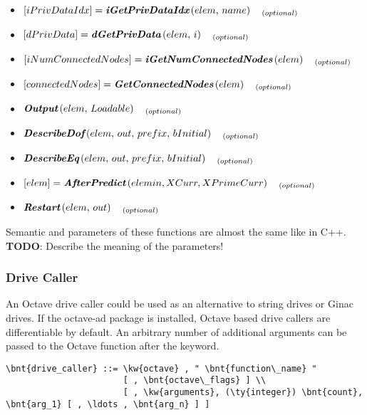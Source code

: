 \begin{itemize}
\item $\left[iPrivDataIdx\right] = \textit{\textbf{iGetPrivDataIdx}}\left(elem,\,name\right)\quad_{(optional)}$
\item $\left[dPrivData\right] = \textit{\textbf{dGetPrivData}}\left(elem,\,i\right)\quad_{(optional)}$
\item $\left[iNumConnectedNodes\right] = \textit{\textbf{iGetNumConnectedNodes}}\left(elem\right)\quad_{(optional)}$
\item $\left[connectedNodes\right] = \textit{\textbf{GetConnectedNodes}}\left(elem\right)\quad_{(optional)}$
\item $\textit{\textbf{Output}}\left(elem,\,Loadable\right)\quad_{(optional)}$
\item $\textit{\textbf{DescribeDof}}\left(elem,\,out,\,prefix,\,bInitial\right)\quad_{(optional)}$
\item $\textit{\textbf{DescribeEq}}\left(elem,\,out,\,prefix,\,bInitial\right)\quad_{(optional)}$
\item $\left[elem\right] = \textit{\textbf{AfterPredict}}\left(elemin, XCurr, XPrimeCurr\right)\quad_{(optional)}$
\item $\textit{\textbf{Restart}}\left(elem,\,out\right)\quad_{(optional)}$
\end{itemize}
Semantic and parameters of these functions are almost the same like in C++. \\
\textbf{TODO}: Describe the meaning of the parameters!

\subsubsection{Drive Caller}
An Octave drive caller could be used as an alternative to string drives or Ginac drives. 
If the octave-ad package is installed, Octave based drive callers are differentiable by default.
An arbitrary number of additional arguments can be passed to the Octave function  after the  keyword.
\begin{Verbatim}[commandchars=\\\{\}]
    \bnt{drive_caller} ::= \kw{octave} , " \bnt{function\_name} "
                       [ , \bnt{octave\_flags} ] \\
                       [ , \kw{arguments}, (\ty{integer}) \bnt{count}, \bnt{arg_1} [ , \ldots , \bnt{arg_n} ] ]
\end{Verbatim}

